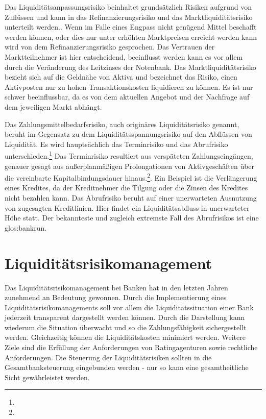 Das Liquiditätsanpassungsrisiko beinhaltet grundsätzlich Risiken aufgrund von Zuflüssen und kann in das Refinanzierungsrisiko und das Marktliquiditätsrisiko unterteilt werden.. Wenn im Falle eines Engpass nicht genügend Mittel beschafft werden können, oder dies nur unter erhöhten Marktpreisen erreicht werden kann wird von dem Refinanzierungsrisiko gesprochen. Das Vertrauen der Marktteilnehmer ist hier entscheidend, beeinflusst werden kann es vor allem durch die Veränderung des Leitzinses der Notenbank. Das Marktliquiditätsrisiko bezieht sich auf die Geldnähe von Aktiva und bezeichnet das Risiko, einen Aktivposten nur zu hohen Transaktionskosten liquidieren zu können. Es ist nur schwer beeinflussbar, da es von dem aktuellen Angebot und der Nachfrage auf dem jeweiligen Markt abhängt. 

Das Zahlungsmittelbedarfsrisiko, auch originäres Liquiditätsrisiko genannt, beruht im Gegensatz zu dem Liquiditätsspannungsrisiko auf den Abflüssen von Liquidität. Es wird hauptsächlich das Terminrisiko und das Abrufrisiko unterschieden.\footnote{ } Das Terminrisiko resultiert aus verspäteten Zahlungseingängen, genauer gesagt aus außerplanmäßigen Prolongationen von Aktivgeschäften über die vereinbarte Kapitalbindungsdauer hinaus.\footnote{ }. Ein Beispiel ist die Verlängerung eines Kredites, da der Kreditnehmer die Tilgung oder die Zinsen des Kredites nicht bezahlen kann. Das Abrufrisiko beruht auf einer unerwarteten Ausnutzung von zugesagten Kreditlinien. Hier findet ein Liquiditätsabfluss in unerwarteter Höhe statt. Der bekannteste und zugleich extremste Fall des Abrufrisikos ist eine \gls{glos:bankrun}.


\section{Liquiditätsrisikomanagement}
Das Liquiditätsrisikomanagement bei Banken hat in den letzten Jahren zunehmend an Bedeutung gewonnen. Durch die Implementierung eines Liquiditätsrisikomanagements  soll vor allem die Liquiditätssituation einer Bank jederzeit transparent dargestellt werden können. Durch die Darstellung kann wiederum die Situation überwacht und so die Zahlungsfähigkeit sichergestellt werden. Gleichzeitig können die Liquiditätskosten minimiert werden. Weitere Ziele sind die Erfüllung der Anforderungen von Ratingagenturen sowie rechtliche Anforderungen. Die Steuerung der Liquiditätsrisiken sollten in die Gesamtbanksteuerung eingebunden werden - nur so kann eine gesamtheitliche Sicht gewährleistet werden.

